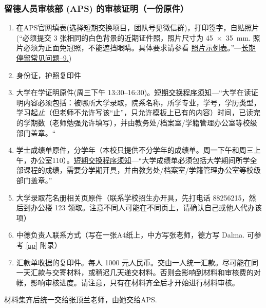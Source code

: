 \documentclass{article}
\begin{document}
\subsubsection{留德人员审核部 (APS) 的审核证明（一份原件）}
\begin{enumerate}
  \item 在APS官网填表(选择短期交换项目，团队号见微信群)，打印签字，自贴照片(“必须提交 3 张相同的白色背景的近期证件照，照片尺寸为 \SI{45x35}{\mm}. 照片必须为正面免冠照，不能遮挡眼睛。具体要求请参看 \href{https://china.diplo.de/blob/1090226/8b25f160e56c0465aa9b5d5d19f89c4f/pdf-fotomustertafel-data.pdf}{照片示例表}。”---\href{https://china.diplo.de/cn-zh/service/visa-einreise/faq-national-visa/1434978}{长期停留常见问题--9.})
  \item 身份证，护照复印件
  \item 大学在学证明原件(周三下午 13:30--16:30)。\href{https://www.aps.org.cn/wp-content/uploads/260_merkblatt_verfahren_austausch_chn.pdf}{短期交换程序须知}---“大学在读证明内容必须包括：被哪所大学录取，院系名称，所学专业，学号，学历类型，学习起\emph{止}（但老师不允许写该“止”，只允许模板上已有的内容）时间，已读完的学期数（老师勉强允许填写），并由教务处/档案室/学籍管理办公室等校级部门盖章。“
  \item 学士成绩单原件，分学年（本校只提供不分学年的成绩单。周一下午和周三上午，办公室110）。\href{https://www.aps.org.cn/wp-content/uploads/260_merkblatt_verfahren_austausch_chn.pdf}{短期交换程序须知}---“大学成绩单必须包括大学期间所学全部课程的成绩，需要分学期开具，并由教务处/档案室/学籍管理办公室等校级部门盖章。”
  \item 大学录取花名册相关页原件（联系学校招生办开具，先打电话 88256215，然后到办公楼 123 领取。注意不同人可能在不同页上，请确认自己或他人代办该项）
  \item 中德负责人联系方式（写在一张A4纸上，中方写张老师，德方写 Dalma. 可参考 \ref{ap} 附录）
  \item 汇款单收据的复印件。每人 1000 元人民币。交由一人统一汇款。尽可能在同一天汇款与交寄材料，或稍迟几天递交材料。否则会影响到材料和审核费的对帐，影响审核进度。请注意，只有在材料齐全后才开始进行材料审核。
\end{enumerate}
材料集齐后统一交给张顶兰老师，由她交给APS.
\end{document}
